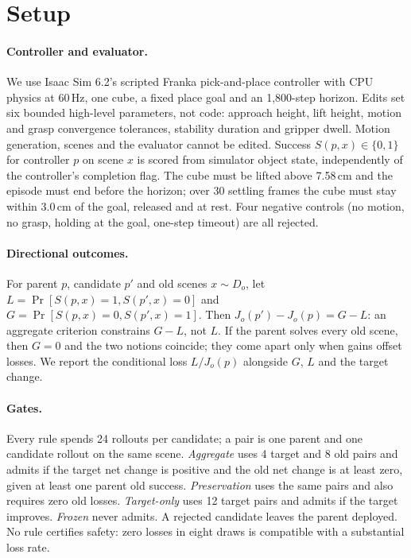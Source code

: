 \documentclass[letterpaper]{article} %
\begin{document}
\section{Setup}
\paragraph{Controller and evaluator.} We use Isaac Sim 6.2's scripted Franka pick-and-place controller \citep{nvidia2026franka} with CPU physics at 60\,Hz, one cube, a fixed place goal and an 1{,}800-step horizon. Edits set six bounded high-level parameters, not code: approach height, lift height, motion and grasp convergence tolerances, stability duration and gripper dwell. Motion generation, scenes and the evaluator cannot be edited. Success $S(p,x)\in\{0,1\}$ for controller $p$ on scene $x$ is scored from simulator object state, independently of the controller's completion flag. The cube must be lifted above 7.58\,cm and the episode must end before the horizon; over 30 settling frames the cube must stay within 3.0\,cm of the goal, released and at rest. Four negative controls (no motion, no grasp, holding at the goal, one-step timeout) are all rejected.

\paragraph{Directional outcomes.} For parent $p$, candidate $p'$ and old scenes $x\sim D_o$, let $L=\Pr[S(p,x)=1, S(p',x)=0]$ and $G=\Pr[S(p,x)=0, S(p',x)=1]$. Then $J_o(p')-J_o(p)=G-L$: an aggregate criterion constrains $G-L$, not $L$. If the parent solves every old scene, then $G=0$ and the two notions coincide; they come apart only when gains offset losses. We report the conditional loss $L/J_o(p)$ alongside $G$, $L$ and the target change.

\paragraph{Gates.} Every rule spends 24 rollouts per candidate; a pair is one parent and one candidate rollout on the same scene. \emph{Aggregate} uses 4 target and 8 old pairs and admits if the target net change is positive and the old net change is at least zero, given at least one parent old success. \emph{Preservation} uses the same pairs and also requires zero old losses. \emph{Target-only} uses 12 target pairs and admits if the target improves. \emph{Frozen} never admits. A rejected candidate leaves the parent deployed. No rule certifies safety: zero losses in eight draws is compatible with a substantial loss rate.
\end{document}
